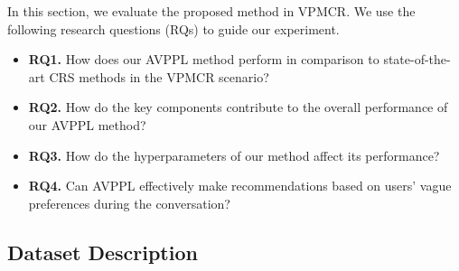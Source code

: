    

In this section, we evaluate the proposed method in VPMCR. We use the following research questions (RQs) to guide our experiment.
\begin{itemize}[leftmargin=1mm]
    \item \textbf{RQ1.} How does our AVPPL method perform in comparison to state-of-the-art CRS methods in the VPMCR scenario?
    \item \textbf{RQ2.} How do the key components contribute to the overall performance of our AVPPL method?
    \item \textbf{RQ3.} How do the hyperparameters of our method affect its performance?
    \item \textbf{RQ4.} Can AVPPL effectively make recommendations based on users' vague preferences during the conversation?
\end{itemize}

\subsection{Dataset Description}
\begin{table}[t]
  \centering
  \caption{Statistics of datasets.}
  \label{tab:data}%
\end{table}%





